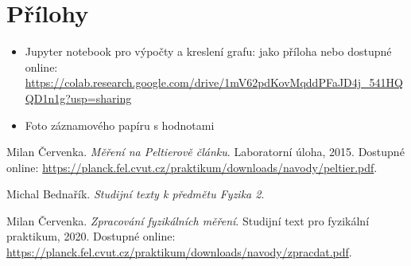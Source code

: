 \documentclass[a4paper,12pt]{article}
\begin{document}
\section{Přílohy}
\begin{itemize}
\item Jupyter notebook pro výpočty a kreslení grafu: jako příloha nebo dostupné online:  \url{https://colab.research.google.com/drive/1mV62pdKovMqddPFaJD4j_541HQQD1n1g?usp=sharing}

\item Foto záznamového papíru s hodnotami
\end{itemize}

\begin{thebibliography}{}

    Milan Červenka. \textit{Měření na Peltierově článku}. Laboratorní úloha, 2015. Dostupné online: \url{https://planck.fel.cvut.cz/praktikum/downloads/navody/peltier.pdf}.

    Michal Bednařík. \textit{Studijní texty k předmětu Fyzika 2}.
    
    Milan Červenka. \textit{Zpracování fyzikálních měření}. Studijní text pro fyzikální praktikum, 2020. Dostupné online: \url{https://planck.fel.cvut.cz/praktikum/downloads/navody/zpracdat.pdf}.

\end{thebibliography}
\end{document}
